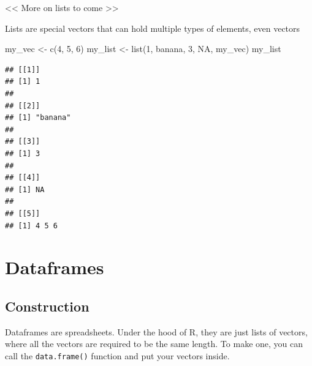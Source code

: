 \documentclass[
]{book}
\newenvironment{Shaded}{\begin{snugshade}}{\end{snugshade}}
\newcommand{\ConstantTok}[1]{\textcolor[rgb]{0.00,0.00,0.00}{#1}}
\newcommand{\DecValTok}[1]{\textcolor[rgb]{0.00,0.00,0.81}{#1}}
\newcommand{\FunctionTok}[1]{\textcolor[rgb]{0.00,0.00,0.00}{#1}}
\newcommand{\NormalTok}[1]{#1}
\newcommand{\OtherTok}[1]{\textcolor[rgb]{0.56,0.35,0.01}{#1}}
\newcommand{\StringTok}[1]{\textcolor[rgb]{0.31,0.60,0.02}{#1}}
\begin{document}
\textless\textless{} More on lists to come \textgreater\textgreater{}

Lists are special vectors that can hold multiple types of elements, even vectors

\begin{Shaded}
\begin{Highlighting}[]
\NormalTok{my\_vec }\OtherTok{\textless{}{-}} \FunctionTok{c}\NormalTok{(}\DecValTok{4}\NormalTok{, }\DecValTok{5}\NormalTok{, }\DecValTok{6}\NormalTok{)}
\NormalTok{my\_list }\OtherTok{\textless{}{-}} \FunctionTok{list}\NormalTok{(}\DecValTok{1}\NormalTok{, }\StringTok{\textquotesingle{}banana\textquotesingle{}}\NormalTok{, }\DecValTok{3}\NormalTok{, }\ConstantTok{NA}\NormalTok{, my\_vec)}
\NormalTok{my\_list}
\end{Highlighting}
\end{Shaded}

\begin{verbatim}
## [[1]]
## [1] 1
## 
## [[2]]
## [1] "banana"
## 
## [[3]]
## [1] 3
## 
## [[4]]
## [1] NA
## 
## [[5]]
## [1] 4 5 6
\end{verbatim}

\hypertarget{dataframes}{%
\section{Dataframes}\label{dataframes}}

\hypertarget{construction}{%
\subsection{Construction}\label{construction}}

Dataframes are spreadsheets. Under the hood of R, they are just lists of vectors, where all the vectors are required to be the same length. To make one, you can call the \texttt{data.frame()} function and put your vectors inside.
\end{document}
